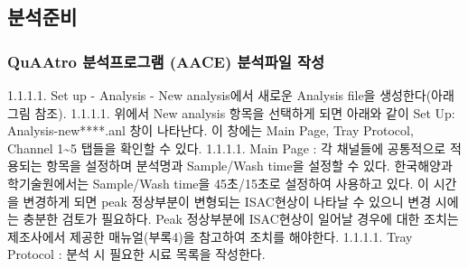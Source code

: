 \documentclass[
]{book}
\begin{document}
\hypertarget{uxbd84uxc11duxc900uxbe44}{%
\subsection{분석준비}\label{uxbd84uxc11duxc900uxbe44}}

\hypertarget{quaatro-uxbd84uxc11duxd504uxb85cuxadf8uxb7a8-aace-uxbd84uxc11duxd30cuxc77c-uxc791uxc131}{%
\subsubsection{QuAAtro 분석프로그램 (AACE) 분석파일 작성}\label{quaatro-uxbd84uxc11duxd504uxb85cuxadf8uxb7a8-aace-uxbd84uxc11duxd30cuxc77c-uxc791uxc131}}

1.1.1.1. Set up - Analysis - New analysis에서 새로운 Analysis file을 생성한다(아래 그림 참조).
1.1.1.1. 위에서 New analysis 항목을 선택하게 되면 아래와 같이 Set Up: Analysis-new****.anl 창이 나타난다. 이 창에는 Main Page, Tray Protocol, Channel 1\textasciitilde5 탭들을 확인할 수 있다.
1.1.1.1. Main Page : 각 채널들에 공통적으로 적용되는 항목을 설정하며 분석명과 Sample/Wash time을 설정할 수 있다. 한국해양과학기술원에서는 Sample/Wash time을 45초/15초로 설정하여 사용하고 있다. 이 시간을 변경하게 되면 peak 정상부분이 변형되는 ISAC현상이 나타날 수 있으니 변경 시에는 충분한 검토가 필요하다. Peak 정상부분에 ISAC현상이 일어날 경우에 대한 조치는 제조사에서 제공한 매뉴얼(부록4)을 참고하여 조치를 해야한다.
1.1.1.1. Tray Protocol : 분석 시 필요한 시료 목록을 작성한다.
\end{document}
